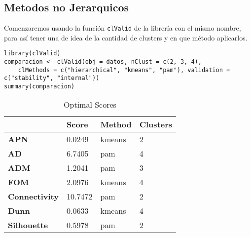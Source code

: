 \documentclass[b4paper]{article}
\begin{document}
    \subsection{Metodos no Jerarquicos}
    Comenzaremos usando la funci\'on \verb|clValid| de la librer\'ia con el mismo nombre, para
    as\'i tener una de idea de la cantidad de clusters y en que m\'etodo aplicarlos.
    \begin{tcolorbox}
        \begin{verbatim}
library(clValid)
comparacion <- clValid(obj = datos, nClust = c(2, 3, 4),
    clMethods = c("hierarchical", "kmeans", "pam"), validation = c("stability", "internal"))
summary(comparacion)\end{verbatim}
    \end{tcolorbox}
    \newpage
    \begin{table}[h]
        \centering
\begin{tabular}{l|l|l|l|}
\cline{2-4}
                                            & \textbf{Score} & \textbf{Method} & \textbf{Clusters} \\ \hline
\multicolumn{1}{|l|}{\textbf{APN}}          & 0.0249         & kmeans          & 2                 \\ \hline
\multicolumn{1}{|l|}{\textbf{AD}}           & 6.7405         & pam             & 4                 \\ \hline
\multicolumn{1}{|l|}{\textbf{ADM}}          & 1.2041         & pam             & 3                 \\ \hline
\multicolumn{1}{|l|}{\textbf{FOM}}          & 2.0976         & kmeans          & 4                 \\ \hline
\multicolumn{1}{|l|}{\textbf{Connectivity}} & 10.7472        & pam             & 2                 \\ \hline
\multicolumn{1}{|l|}{\textbf{Dunn}}         & 0.0633         & kmeans          & 4                 \\ \hline
\multicolumn{1}{|l|}{\textbf{Silhouette}}   & 0.5978         & pam             & 2                 \\ \hline
\end{tabular}
        \caption{Optimal Scores}
\end{table}
\end{document}
